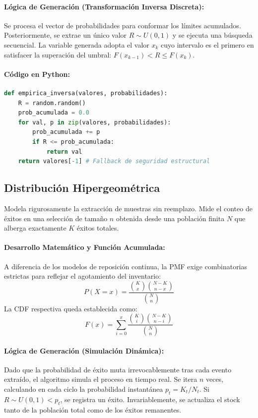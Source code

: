 \documentclass{article}
\begin{document}
\paragraph{Lógica de Generación (Transformación Inversa Discreta):}
Se procesa el vector de probabilidades para conformar los límites acumulados. Posteriormente, se extrae un único valor $R \sim U(0,1)$ y se ejecuta una búsqueda secuencial. La variable generada adopta el valor $x_k$ cuyo intervalo es el primero en satisfacer la superación del umbral: $F(x_{k-1}) < R \le F(x_k)$.

\paragraph{Código en Python:}
\begin{lstlisting}[language=Python, caption=Generador Empírico por partición de intervalos.]
def empirica_inversa(valores, probabilidades):
    R = random.random()
    prob_acumulada = 0.0
    for val, p in zip(valores, probabilidades):
        prob_acumulada += p
        if R <= prob_acumulada:
            return val
    return valores[-1] # Fallback de seguridad estructural
\end{lstlisting}

\subsection{Distribución Hipergeométrica}
Modela rigurosamente la extracción de muestras sin reemplazo. Mide el conteo de éxitos en una selección de tamaño $n$ obtenida desde una población finita $N$ que alberga exactamente $K$ éxitos totales.

\paragraph{Desarrollo Matemático y Función Acumulada:}
A diferencia de los modelos de reposición continua, la PMF exige combinatorias estrictas para reflejar el agotamiento del inventario:
\begin{equation}
P(X = x) = \frac{\binom{K}{x} \binom{N - K}{n - x}}{\binom{N}{n}}
\end{equation}
La CDF respectiva queda establecida como:
\begin{equation}
F(x) = \sum_{i=0}^{x} \frac{\binom{K}{i} \binom{N - K}{n - i}}{\binom{N}{n}}
\end{equation}

\paragraph{Lógica de Generación (Simulación Dinámica):}
Dado que la probabilidad de éxito muta irrevocablemente tras cada evento extraído, el algoritmo simula el proceso en tiempo real. Se itera $n$ veces, calculando en cada ciclo la probabilidad instantánea $p_t = K_t / N_t$. Si $R \sim U(0,1) < p_t$, se registra un éxito. Invariablemente, se actualiza el stock tanto de la población total como de los éxitos remanentes.
\end{document}
